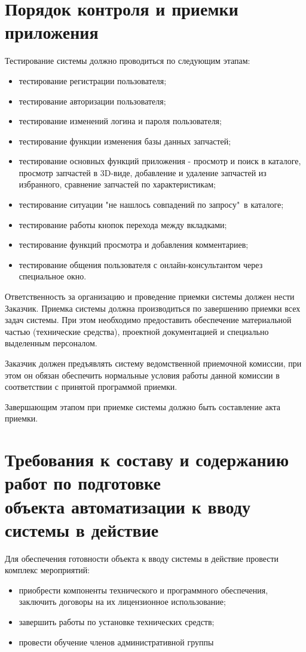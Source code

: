 \documentclass[14pt]{extreport}
\begin{document}
\newpage
\section{Порядок контроля и приемки приложения}

Тестирование системы должно проводиться по следующим этапам:
\begin{itemize}
	\item тестирование регистрации пользователя;
	\item тестирование авторизации пользователя;
	\item тестирование изменений логина и пароля пользователя;
	\item тестирование функции изменения базы данных запчастей;
	\item тестирование основных функций приложения - просмотр и поиск в каталоге, просмотр запчастей в 3D-виде, добавление и удаление запчастей из избранного, сравнение запчастей по характеристикам;
	\item тестирование ситуации "не нашлось совпадений по запросу"\ в каталоге;
	\item тестирование работы кнопок перехода между вкладками;
	\item тестирование функций просмотра и добавления комментариев;
	\item тестирование общения пользователя с онлайн-консультантом через специальное окно.
\end{itemize}

Ответственность за организацию и проведение приемки системы должен нести Заказчик. Приемка системы должна производиться по завершению приемки всех задач системы. При этом необходимо предоставить обеспечение материальной частью (технические средства), проектной документацией и специально выделенным персоналом.

Заказчик должен предъявлять систему ведомственной приемочной комиссии, при этом он обязан обеспечить нормальные условия работы данной комиссии в соответствии с принятой программой приемки.

Завершающим этапом при приемке системы должно быть составление акта приемки.

\newpage
\section{Требования к составу и содержанию работ по подготовке \\
объекта автоматизации к вводу системы в действие}
Для обеспечения готовности объекта к вводу системы в действие провести комплекс мероприятий:
\begin{itemize}
	\item приобрести компоненты технического и программного обеспечения, заключить договоры на их лицензионное использование;
	\item завершить работы по установке технических средств;
	\item провести обучение членов административной группы
\end{itemize}
\end{document}
